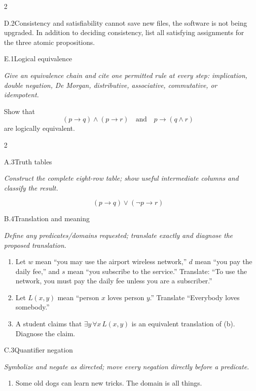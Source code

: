 \documentclass[9pt]{extarticle}
\begin{document}
\begin{multicols}{2}
\begin{CoreProblem}{D.2}{Consistency and satisfiability}
cannot save new files, the software is not being upgraded. In addition to
deciding consistency, list all satisfying assignments for the three atomic
propositions.
\end{CoreProblem}
\begin{CoreProblem}{E.1}{Logical equivalence}
{\scriptsize\textit{Give an equivalence chain and cite one permitted rule at every step: implication, double negation, De Morgan, distributive, associative, commutative, or idempotent.}\par}
Show that
\[
  (p\to q)\land(p\to r)
  \quad\text{and}\quad
  p\to(q\land r)
\]
are logically equivalent.
\end{CoreProblem}
\end{multicols}
\CoreWorkArea
\FormBreak
{}
\begin{multicols}{2}
\begin{CoreProblem}{A.3}{Truth tables}
{\scriptsize\textit{Construct the complete eight-row table; show useful intermediate columns and classify the result.}\par}
\[
  (p\to q)\lor(\neg p\to r)
\]
\end{CoreProblem}
\begin{CoreProblem}{B.4}{Translation and meaning}
{\scriptsize\textit{Define any predicates/domains requested; translate exactly and diagnose the proposed translation.}\par}
\begin{enumerate}[label=(\alph*)]
  \item Let $w$ mean ``you may use the airport wireless network,'' $d$ mean
        ``you pay the daily fee,'' and $s$ mean ``you subscribe to the
        service.'' Translate: ``To use the network, you must pay the daily fee
        unless you are a subscriber.''
  \item Let $L(x,y)$ mean ``person $x$ loves person $y$.'' Translate
        ``Everybody loves somebody.''
  \item A student claims that $\exists y\,\forall x\,L(x,y)$ is an equivalent
        translation of (b). Diagnose the claim.
\end{enumerate}
\end{CoreProblem}
\begin{CoreProblem}{C.3}{Quantifier negation}
{\scriptsize\textit{Symbolize and negate as directed; move every negation directly before a predicate.}\par}
\begin{enumerate}[label=(\alph*)]
  \item Some old dogs can learn new tricks. The domain is all things.

\end{enumerate}
\end{CoreProblem}
\end{multicols}
\end{document}

